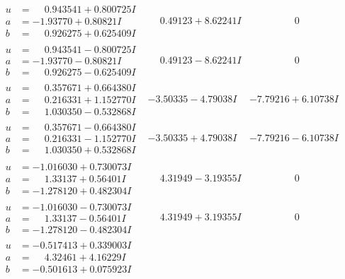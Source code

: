 \documentclass[1p]{elsarticle_modified}
\theoremstyle{definition}
\begin{document}
$$\begin{array}{c|c|c}
\begin{aligned}
u &= \phantom{-}0.943541 + 0.800725 I \\
a &= -1.93770 + 0.80821 I \\
b &= \phantom{-}0.926275 + 0.625409 I\end{aligned}
 & \phantom{-}0.49123 + 8.62241 I & \phantom{-0.000000 } 0 \\ \hline\begin{aligned}
u &= \phantom{-}0.943541 - 0.800725 I \\
a &= -1.93770 - 0.80821 I \\
b &= \phantom{-}0.926275 - 0.625409 I\end{aligned}
 & \phantom{-}0.49123 - 8.62241 I & \phantom{-0.000000 } 0 \\ \hline\begin{aligned}
u &= \phantom{-}0.357671 + 0.664380 I \\
a &= \phantom{-}0.216331 + 1.152770 I \\
b &= \phantom{-}1.030350 - 0.532868 I\end{aligned}
 & -3.50335 - 4.79038 I & -7.79216 + 6.10738 I \\ \hline\begin{aligned}
u &= \phantom{-}0.357671 - 0.664380 I \\
a &= \phantom{-}0.216331 - 1.152770 I \\
b &= \phantom{-}1.030350 + 0.532868 I\end{aligned}
 & -3.50335 + 4.79038 I & -7.79216 - 6.10738 I \\ \hline\begin{aligned}
u &= -1.016030 + 0.730073 I \\
a &= \phantom{-}1.33137 + 0.56401 I \\
b &= -1.278120 + 0.482304 I\end{aligned}
 & \phantom{-}4.31949 - 3.19355 I & \phantom{-0.000000 } 0 \\ \hline\begin{aligned}
u &= -1.016030 - 0.730073 I \\
a &= \phantom{-}1.33137 - 0.56401 I \\
b &= -1.278120 - 0.482304 I\end{aligned}
 & \phantom{-}4.31949 + 3.19355 I & \phantom{-0.000000 } 0 \\ \hline\begin{aligned}
u &= -0.517413 + 0.339003 I \\
a &= \phantom{-}4.32461 + 4.16229 I \\
b &= -0.501613 + 0.075923 I\end{aligned}

\end{array}$$
\end{document}
